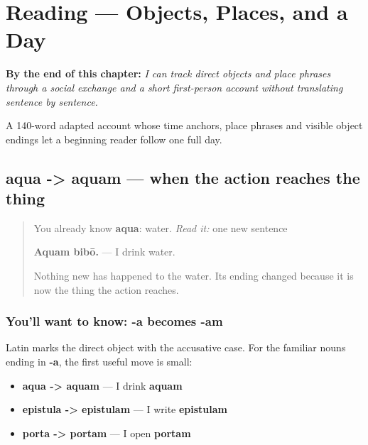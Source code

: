 
\chapter{Reading — Objects, Places, and a Day}
\label{ch:la-dies-meus}

\begin{chapteropening}
\textbf{By the end of this chapter:} \emph{I can track direct objects and place phrases through a social exchange and a short first-person account without translating sentence by sentence.}

A 140-word adapted account whose time anchors, place phrases and visible object endings let a beginning reader follow one full day.
\end{chapteropening}

\section[aqua -> aquam; epistula -> epistulam …]{aqua -> aquam — when the action reaches the thing}

\label{lesson:LA-C59-a-objects}



\begin{quote}
You already know \textbf{aqua}: water. \emph{Read it:} one new sentence

\textbf{Aquam bibō.} — I drink water.

Nothing new has happened to the water. Its ending changed because it is now the thing the action reaches.
\end{quote}

\subsection*{You'll want to know: -a becomes -am}
Latin marks the direct object with the accusative case. For the familiar nouns ending in \textbf{-a}, the first useful move is small:

\begin{itemize}
\raggedright
  \item \textbf{aqua -> aquam} — I drink \textbf{aquam}
  \item \textbf{epistula -> epistulam} — I write \textbf{epistulam}
  \item \textbf{porta -> portam} — I open \textbf{portam}
\end{itemize}

